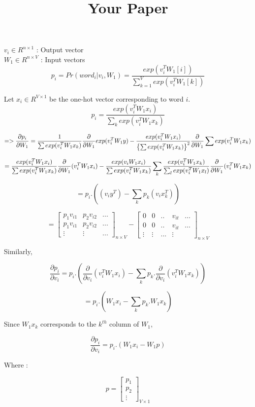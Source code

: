 \documentclass[a4paper]{article}
\title{Your Paper}
\begin{document}
$v_i \in R^{n \times 1}$ : Output vector \\
$W_1 \in R^{n\times V}$ : Input vectors \\

\[p_i = Pr(word_i|v_i,W_1) = \frac{exp(v_i^TW_1[i])}{\sum_{k=1}^{V} exp(v_i^TW_1[k]) }\]

Let $x_i \in R^{V\times 1}$ be the one-hot vector corresponding to word $i$.\\

\[p_i = \frac{exp(v_i^T W_1 x_i)}{\sum_k exp(v_i^T W_1 x_k)}\]

\[
	=>\frac{\partial p_i}{\partial W_1} = \frac{1 }{\sum exp(v_i^TW_1x_k)}  \frac{  \partial   }{\partial W_1} exp(v_i^TW_1 y) - \\
	\frac{exp(v_i^TW_1 x_i)}{ \left \{  \sum exp(v_i^TW_1 x_k) \right \} ^2 }\frac{\partial }{\partial W_1} \sum exp(v_i^T W_1 x_k)
\]

\[ =  \frac{exp(v_i^T W_1 x_i)}{\sum exp(v_i^T W_1 x_k)} \frac{\partial}{\partial W_1} (v_i^T W_1 x_i) - \\
\frac{exp(v_i W_1 x_i)}{ \sum exp(v_i^T W_1 x_k) } \sum_k \frac{exp(v_i^T W_1 x_k)}{\sum_l exp(v_i^T W_1 x_l)} \frac{\partial}{\partial W_1} (v_i^T W_1 x_k)
\]

\[ = p_i  . \left(  (v_i y^T) -  \sum_k p_k (v_i x_k^T) \right)\]

\[ = 
   \begin{bmatrix}
             p_1 v_{i1}  & p_2 v_{i2}     & . . .  \\
              p_1 v_{i1}  & p_2 v_{i2} & . . .  \\
              \vdots & \vdots & . . .
  \end{bmatrix} _{n\times V}
- 
   \begin{bmatrix}
             0  & 0 & . . & v_{it}    & . . .  \\
             0  & 0 & . . & v_{it}    & . . .  \\
              \vdots & \vdots & . . . & \vdots
   \end{bmatrix} _{n\times V}
\]

Similarly, 

\[\frac{\partial p_i}{\partial v_i} = p_i. \left(   \frac{\partial}{\partial v_i}(v_i^T W_1 x_i) - \sum_k p_k. \frac{\partial}{\partial v_i} (v_i^T W_1 x_k) \right)\]

\[ = p_i. \left(   W_1 x_i - \sum_k p_k. W_1 x_k \right)\]

Since $W_1 x_k$ corresponds to the $k^{th}$ column of $W_1$,

\[ \frac{\partial p_i}{\partial v_i} = p_i. \left( W_1 x_i - W_1 p \right)\]

Where : 

\[ p =   \begin{bmatrix}
             p_1 \\
              p_2\\
              \vdots
  \end{bmatrix}_{V\times 1} \]
\end{document}
